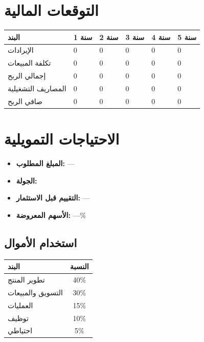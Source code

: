 \documentclass[11pt,a4paper]{article}
\begin{document}
\section{التوقعات المالية}
\label{sec:financials}

\begin{table}[H]
\centering
\renewcommand{\arraystretch}{1.4}
\begin{tabularx}{\textwidth}{L{4cm} C{2cm} C{2cm} C{2cm} C{2cm} C{2cm}}
\toprule
\textbf{البند} & \textbf{سنة 1} & \textbf{سنة 2} & \textbf{سنة 3} & \textbf{سنة 4} & \textbf{سنة 5} \\
\midrule
الإيرادات & 0 & 0 & 0 & 0 & 0 \\
تكلفة المبيعات & 0 & 0 & 0 & 0 & 0 \\
إجمالي الربح & 0 & 0 & 0 & 0 & 0 \\
المصاريف التشغيلية & 0 & 0 & 0 & 0 & 0 \\
صافي الربح & 0 & 0 & 0 & 0 & 0 \\
\bottomrule
\end{tabularx}
\end{table}

\section{الاحتياجات التمويلية}
\label{sec:funding}

\begin{itemize}
    \item \textbf{المبلغ المطلوب:} --- 
    \item \textbf{الجولة:} 
    \item \textbf{التقييم قبل الاستثمار:} --- 
    \item \textbf{الأسهم المعروضة:} ---\%
\end{itemize}

\subsection{استخدام الأموال}
\begin{table}[H]
\centering
\begin{tabular}{|l|c|}
\hline
\textbf{البند} & \textbf{النسبة} \\
\hline
تطوير المنتج & 40\% \\
التسويق والمبيعات & 30\% \\
العمليات & 15\% \\
توظيف & 10\% \\
احتياطي & 5\% \\
\hline
\end{tabular}
\end{table}
\end{document}
